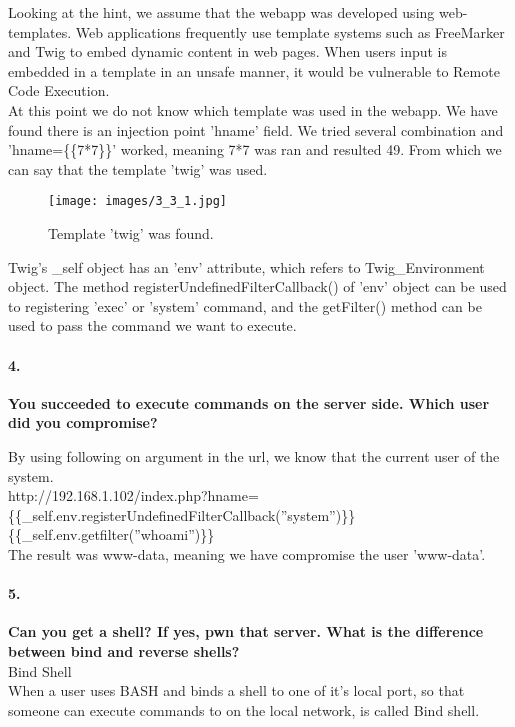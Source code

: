 \documentclass[12pt]{report}
\begin{document}
	Looking at the hint, we assume that the webapp was developed using web-templates. Web applications frequently use template systems such as FreeMarker and Twig to embed dynamic content in web pages. When users input is embedded in a template in an unsafe manner, it would be vulnerable to Remote Code Execution.\\
	
	At this point we do not know which template was used in the webapp. We have found there is an injection point 'hname' field. We tried several combination and 'hname=\{\{7*7\}\}' worked, meaning 7*7 was ran and resulted 49. From which we can say that the template 'twig' was used.
	
	\begin{figure}[H]
		\texttt{[image: images/3\_3\_1.jpg]}
		\caption{Template 'twig' was found.}
	\end{figure}
	
	Twig's {\sf \_self} object has an {\sf 'env'} attribute, which refers to {\sf Twig\_Environment} object. The method {\sf registerUndefinedFilterCallback()} of {\sf 'env'} object can be used to registering {\sf 'exec'} or {\sf 'system'} command, and the {\sf getFilter()} method can be used to pass the command we want to execute.\\
	
	\paragraph*{4.}{\bf You succeeded to execute commands on the server side. Which user did you compromise?}
	
	By using following on argument in the url, we know that the current user of the system.\\
	{\sf http://192.168.1.102/index.php?hname=\{\{\_self.env.registerUndefinedFilterCallback(''system'')\}\} \{\{\_self.env.getfilter(''whoami'')\}\}}\\
	
	The result was {\sf www-data}, meaning we have compromise the user 'www-data'.
	
	\paragraph*{5.}{\bf Can you get a shell? If yes, pwn that server. What is the difference between bind and reverse shells?}\\
	
	Bind Shell\\
	When a user uses BASH and binds a shell to one of it's local port, so that someone can execute commands to on the local network, is called Bind shell.\\
	
\end{document}
